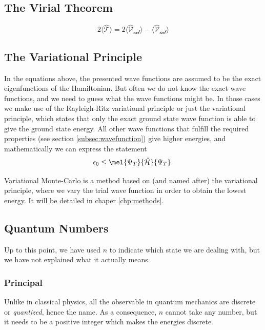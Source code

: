 \cite{griffiths_introduction_2005}

\subsection{The Virial Theorem} \label{sec:virial}
\begin{equation}
2\langle \mathcal{\hat{T}} \rangle = 2\langle \mathcal{\hat{V}_{\text{ext}}} \rangle - \langle \mathcal{\hat{V}_{\text{int}}} \rangle
\end{equation}

\subsection{The Variational Principle}
In the equations above, the presented wave functions are assumed to be the exact eigenfunctions of the Hamiltonian. But often we do not know the exact wave functions, and we need to guess what the wave functions might be. In those cases we make use of the Rayleigh-Ritz variational principle or just the variational principle, which states that only the exact ground state wave function is able to give the ground state energy. All other wave functions that fulfill the required properties (see section \ref{subsec:wavefunction}) give higher energies, and mathematically we can express the statement
\begin{equation}
\epsilon_0\leq\mel{\Psi_T}{\hat{\mathcal{H}}}{\Psi_T}.
\label{eq:variationalprinciple}
\end{equation}

Variational Monte-Carlo is a method based on (and named after) the variational principle, where we vary the trial wave function in order to obtain the lowest energy. It will be detailed in chaper \eqref{chp:methods}.

\subsection{Quantum Numbers}
Up to this point, we have used $n$ to indicate which state we are dealing with, but we have not explained what it actually means. 

\subsubsection*{Principal}
Unlike in classical physics, all the observable in quantum mechanics are discrete or \textit{quantized}, hence the name. As a consequence, $n$ cannot take any number, but it needs to be a positive integer which makes the energies discrete.

